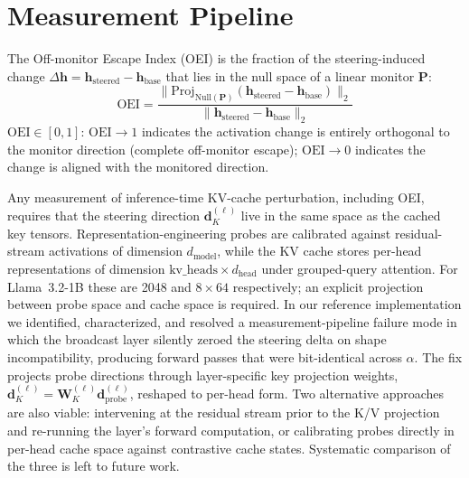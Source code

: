 \documentclass{article}
\begin{document}
\section{Measurement Pipeline}\label{sec:measurement-prereqs}

The Off-monitor Escape Index (OEI) is the fraction of the steering-induced change $\Delta\mathbf{h} = \mathbf{h}_{\text{steered}} - \mathbf{h}_{\text{base}}$ that lies in the null space of a linear monitor $\mathbf{P}$:
\begin{equation}
\text{OEI} = \frac{\|\text{Proj}_{\text{Null}(\mathbf{P})}(\mathbf{h}_{\text{steered}} - \mathbf{h}_{\text{base}})\|_2}{\|\mathbf{h}_{\text{steered}} - \mathbf{h}_{\text{base}}\|_2}
\label{eq:oei}
\end{equation}
$\text{OEI} \in [0, 1]$: $\text{OEI} \to 1$ indicates the activation change is entirely orthogonal to the monitor direction (complete off-monitor escape); $\text{OEI} \to 0$ indicates the change is aligned with the monitored direction.

Any measurement of inference-time KV-cache perturbation, including OEI, requires that the steering direction $\mathbf{d}_K^{(\ell)}$ live in the same space as the cached key tensors. Representation-engineering probes are calibrated against residual-stream activations of dimension $d_{\text{model}}$, while the KV cache stores per-head representations of dimension $\text{kv\_heads} \times d_{\text{head}}$ under grouped-query attention. For Llama~3.2-1B these are 2048 and $8 \times 64$ respectively; an explicit projection between probe space and cache space is required. In our reference implementation we identified, characterized, and resolved a measurement-pipeline failure mode in which the broadcast layer silently zeroed the steering delta on shape incompatibility, producing forward passes that were bit-identical across $\alpha$. The fix projects probe directions through layer-specific key projection weights, $\mathbf{d}_K^{(\ell)} = \mathbf{W}_K^{(\ell)} \mathbf{d}_{\text{probe}}^{(\ell)}$, reshaped to per-head form. Two alternative approaches are also viable: intervening at the residual stream prior to the K/V projection and re-running the layer's forward computation, or calibrating probes directly in per-head cache space against contrastive cache states. Systematic comparison of the three is left to future work.
\end{document}
